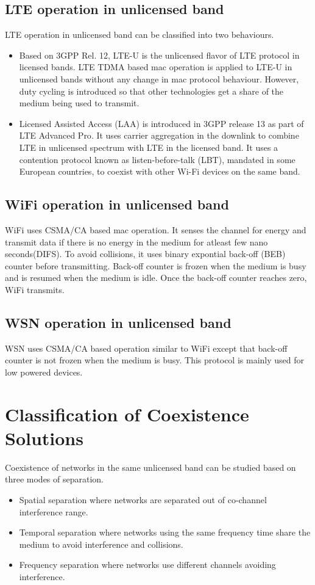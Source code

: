 \documentclass[a4paper]{article}
\begin{document}
\subsection{LTE operation in unlicensed band}
{LTE} operation in unlicensed band can be classified into two behaviours.
\begin{itemize}
\item Based on 3GPP Rel. 12, {LTE-U} is the unlicensed flavor of {LTE} protocol in licensed bands. {LTE} {TDMA} based mac operation is applied to {LTE-U} in unlicensed bands without any change in mac protocol behaviour. However, duty cycling is introduced so that other technologies get a share of the medium being used to transmit.
\item Licensed Assisted Access ({LAA}) is introduced in 3GPP release 13 as part of {LTE Advanced Pro}. It uses carrier aggregation in the downlink to combine {LTE} in unlicensed spectrum with LTE in the licensed band. It uses a contention protocol known as listen-before-talk (LBT), mandated in some European countries, to coexist with other Wi-Fi devices on the same band.
\end{itemize}

\subsection{WiFi operation in unlicensed band}
{WiFi} uses {CSMA/CA} based mac operation. It senses the channel for energy and transmit data if there is no energy in the medium for atleast few nano seconds({DIFS}). To avoid collisions, it uses binary expontial back-off ({BEB}) counter before transmitting. Back-off counter is frozen when the medium is busy and is resumed when the medium is idle. Once the back-off counter reaches zero, {WiFi} transmits.
\subsection{WSN operation in unlicensed band}
{WSN} uses {CSMA/CA} based operation similar to {WiFi} except that back-off counter is not frozen when the medium is busy. This protocol is mainly used for low powered devices.

\section{Classification of Coexistence Solutions}
Coexistence of networks in the same unlicensed band can be studied based on three modes of separation.
	\begin{itemize}
		\item Spatial separation where networks are separated out of co-channel interference range.
		\item Temporal separation where networks using the same frequency time share the medium to avoid interference and collisions.
		\item Frequency separation where networks use different channels avoiding interference.
	\end{itemize}
\end{document}
